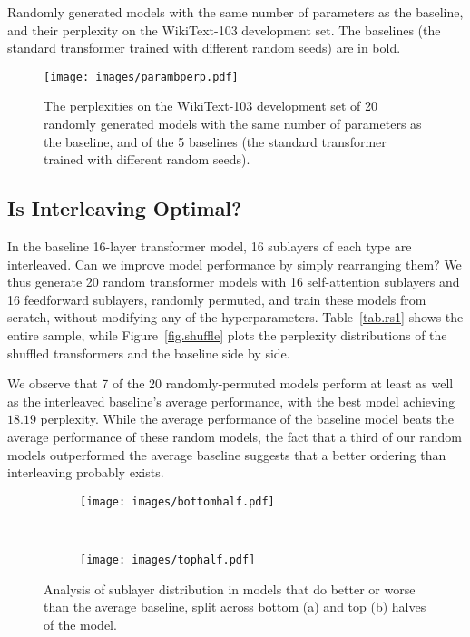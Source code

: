 \documentclass[11pt,a4paper]{article}
\begin{document}
\begin{table}[t]
 \caption{Randomly generated models with the same number of parameters as the baseline, and their perplexity on the WikiText-103 development set. The baselines (the standard transformer trained with different random seeds) are in bold.}
\label{tab.budget}
\end{table}

\begin{figure}[t]
\centering
\texttt{[image: images/parambperp.pdf]}
\caption{The perplexities on the WikiText-103 development set of 20 randomly generated models with the same number of parameters as the baseline, and of the 5 baselines (the standard transformer trained with different random seeds).} 
\label{fig.budget}
\end{figure}

\subsection{Is Interleaving Optimal?}
\label{sec.interleaving}

In the baseline 16-layer transformer model, 16 sublayers of each type are interleaved. Can we improve model performance by simply rearranging them?
We thus generate 20 random transformer models with 16 self-attention sublayers and 16 feedforward sublayers, randomly permuted, and train these models from scratch, without modifying any of the hyperparameters. 
Table~\ref{tab.rs1} shows the entire sample, while Figure~\ref{fig.shuffle} plots the perplexity distributions of the shuffled transformers and the baseline side by side.

We observe that 7 of the 20 randomly-permuted models perform at least as well as the interleaved baseline's average performance, with the best model achieving $18.19$ perplexity.
While the average performance of the baseline model beats the average performance of these random models, the fact that a third of our random models outperformed the average baseline suggests that a better ordering than interleaving probably exists.



\begin{figure*}[t]
\begin{subfigure}[t]{0.48\linewidth}
\centering
\texttt{[image: images/bottomhalf.pdf]}
\caption{}
\end{subfigure}
~
\begin{subfigure}[t]{0.48\linewidth}
\centering
\texttt{[image: images/tophalf.pdf]}
\caption{}
\end{subfigure}
\caption{Analysis of sublayer distribution in models that do better or worse than the average  baseline, split across bottom (a) and top (b) halves of the model.}
\label{fig.split}
\end{figure*}
\end{document}
